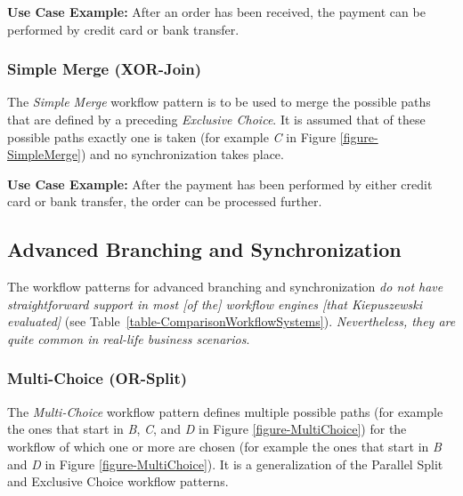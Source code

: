 \textbf{Use Case Example:} After an order has been received, the payment can
be performed by credit card or bank transfer.

\subsubsection{Simple Merge (XOR-Join)}

The \emph{Simple Merge} workflow pattern is to be used to merge the possible
paths that are defined by a preceding \emph{Exclusive Choice}. It is assumed
that of these possible paths exactly one is taken (for example \emph{C} in
Figure \ref{figure-SimpleMerge}) and no synchronization takes place.

\textbf{Use Case Example:} After the payment has been performed by either
credit card or bank transfer, the order can be processed further.

\subsection{Advanced Branching and Synchronization}
\label{subsection-AdvancedBranchingAndSynchronization}

The workflow patterns for advanced branching and synchronization \emph{do
not have straightforward support in most [of the] workflow engines [that
Kiepuszewski evaluated]} (see Table~\ref{table-ComparisonWorkflowSystems}).
\emph{Nevertheless, they are quite common in real-life business scenarios}.

\subsubsection{Multi-Choice (OR-Split)}

The \emph{Multi-Choice} workflow pattern defines multiple possible paths
(for example the ones that start in \emph{B}, \emph{C}, and \emph{D} in Figure
\ref{figure-MultiChoice}) for the workflow of which one or more are chosen
(for example the ones that start in \emph{B} and \emph{D} in Figure
\ref{figure-MultiChoice}). It is a generalization of the Parallel Split and
Exclusive Choice workflow patterns.

